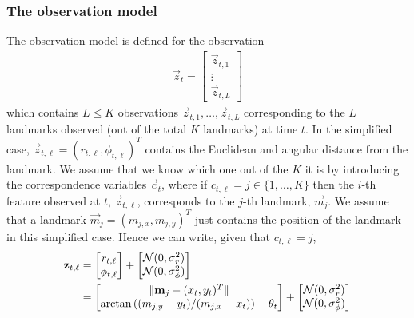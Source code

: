 \subsubsection{The observation model}
\label{subsubsec:models/kf/localisation/obs}
The observation model is defined for the observation
\begin{align}
	\vec z_t = 
		\begin{bmatrix}
			\vec z_{t, 1} \\
			\vdots \\
			\vec z_{t, L}
		\end{bmatrix} \label{eqn:models/kf/localisation/obs}
\end{align}
which contains $L \leq K$ observations $\vec z_{t, 1}, \dotsc, \vec z_{t, L}$ corresponding to the $L$ landmarks observed (out of the total $K$ landmarks) at time $t$. In the simplified case, $\vec z_{t, \ell} = (r_{t, \ell}, \phi_{t, \ell})^T$ contains the Euclidean and angular distance from the landmark. We assume that we know which one out of the $K$ it is by introducing the correspondence variables $\vec c_t$, where if $c_{t, \ell} = j \in \{1, \dotsc, K\}$ then the $i$-th feature observed at $t$, $\vec z_{t, \ell}$, corresponds to the $j$-th landmark, $\vec m_j$. We assume that a landmark $\vec m_j = (m_{j, x}, m_{j, y})^T$ just contains the position of the landmark in this simplified case. Hence we can write, given that $c_{t, \ell} = j$,
\begin{align}
	\boldsymbol{\mathbf{z}}_{t, \ell} &= 
						\begin{bmatrix}
							r_{t, \ell} \\
							\phi_{t, \ell}
						\end{bmatrix} 
						+
						\begin{bmatrix}
							\operatorname{\mathcal N}(0, \sigma^2_r) \\
							\operatorname{\mathcal N}(0, \sigma^2_\phi)
						\end{bmatrix} \\
					&= 
						\begin{bmatrix}
							\|\boldsymbol{\mathbf{m}}_j - (x_t, y_t)^T\| \\
							\arctan\left((m_{j, y} - y_t) / (m_{j, x} - x_t) \right) - \theta_t
						\end{bmatrix}
						+
						\begin{bmatrix}
							\operatorname{\mathcal N}(0, \sigma^2_r) \\
							\operatorname{\mathcal N}(0, \sigma^2_\phi)
						\end{bmatrix} \label{eqn:models/kf/localisation/obs2}
\end{align}
